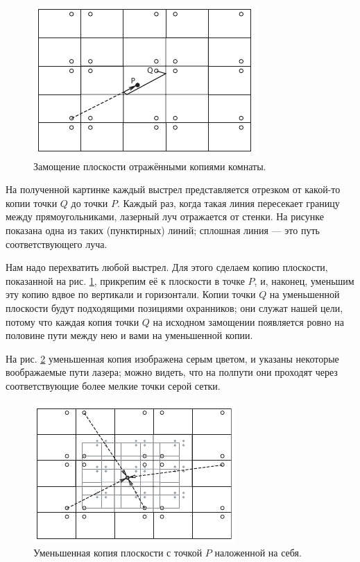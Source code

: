\begin{figure}[b!]
\centering
\includegraphics[scale=1]{pics/room1}
\caption{Замощение плоскости отражёнными копиями комнаты.}
\label{pic:room1}
\end{figure}

На полученной картинке каждый выстрел представляется отрезком от какой-то копии точки $Q$ до точки $P$.
Каждый раз, когда такая линия пересекает границу между прямоугольниками, лазерный луч отражается от стенки.
На рисунке показана одна из таких (пунктирных) линий; сплошная линия --- это путь соответствующего луча.

Нам надо перехватить любой выстрел.
Для этого сделаем копию плоскости, показанной на рис. \ref{pic:room1}, прикрепим её к плоскости в точке $P$, и, наконец, уменьшим эту копию вдвое по вертикали и горизонтали.
Копии точки $Q$ на уменьшенной плоскости будут подходящими позициями охранников;
они служат нашей цели, потому что каждая копия точки $Q$ на исходном замощении появляется ровно на половине пути между нею и вами на уменьшенной копии.

На рис. \ref{pic:room2} уменьшенная копия изображена серым цветом, и указаны некоторые воображаемые пути лазера; можно видеть, что на полпути они проходят через соответствующие более мелкие точки серой сетки.

\begin{figure}[t!]
\centering
\includegraphics[scale=1]{pics/room2}
\caption{Уменьшенная копия плоскости с точкой $P$ наложенной на себя.}
\label{pic:room2}
\end{figure}

